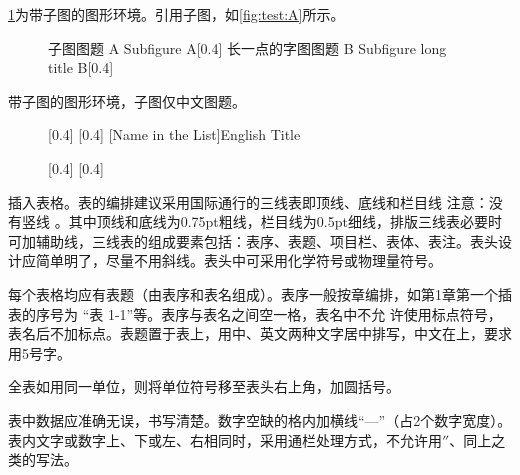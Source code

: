 \begin{figure}[htbp]
	\centering
\end{figure}

\cref{fig:test}为带子图的图形环境。引用子图，如\cref{fig:test:A}所示。
\begin{figure}[htbp]
    \centering
    \bisubcaptionbox
    {子图图题 A\label{fig:test:A}}
    {Subfigure A}[0.4\textwidth]{}%
    \qquad
    \bisubcaptionbox
    {长一点的字图图题 B\label{fig:test:B}}
    {Subfigure long title B}[0.4\textwidth]{}%
    \label{fig:test}
\end{figure}

带子图的图形环境，子图仅中文图题。
\begin{figure}[htbp]
    \centering
    [0.4\textwidth]{}%
    \qquad
    [0.4\textwidth]{}%
    [Name in the List]{English Title}
    \label{fig:test2}
\end{figure}

\begin{figure}[htbp]
    \centering
    [0.4\textwidth]{}%
    \qquad
    [0.4\textwidth]{}%
    \label{fig:test3}
\end{figure}

插入表格。表的编排建议采用国际通行的三线表即顶线、底线和栏目线 注意：没有竖线 。其中顶线和底线为0.75pt粗线，栏目线为0.5pt细线，排版三线表必要时可加辅助线，三线表的组成要素包括：表序、表题、项目栏、表体、表注。表头设计应简单明了，尽量不用斜线。表头中可采用化学符号或物理量符号。

每个表格均应有表题（由表序和表名组成）。表序一般按章编排，如第1章第一个插表的序号为 “表 1-1”等。表序与表名之间空一格，表名中不允 许使用标点符号，表名后不加标点。表题置于表上，用中、英文两种文字居中排写，中文在上，要求用5号字。

全表如用同一单位，则将单位符号移至表头右上角，加圆括号。

表中数据应准确无误，书写清楚。数字空缺的格内加横线“—”（占2个数字宽度）。表内文字或数字上、下或左、右相同时，采用通栏处理方式，不允许用$ '' $、同上之类的写法。

